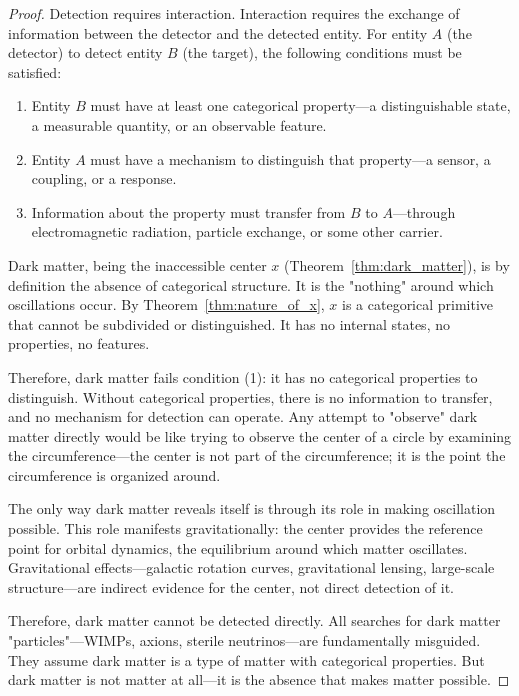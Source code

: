 \documentclass[12pt,a4paper]{article}
\theoremstyle{definition}
\theoremstyle{remark}
\begin{document}
\begin{proof}
Detection requires interaction. Interaction requires the exchange of information between the detector and the detected entity. For entity $A$ (the detector) to detect entity $B$ (the target), the following conditions must be satisfied:
\begin{enumerate}
    \item Entity $B$ must have at least one categorical property—a distinguishable state, a measurable quantity, or an observable feature.
    \item Entity $A$ must have a mechanism to distinguish that property—a sensor, a coupling, or a response.
    \item Information about the property must transfer from $B$ to $A$—through electromagnetic radiation, particle exchange, or some other carrier.
\end{enumerate}

Dark matter, being the inaccessible center $x$ (Theorem~\ref{thm:dark_matter}), is by definition the absence of categorical structure. It is the "nothing" around which oscillations occur. By Theorem~\ref{thm:nature_of_x}, $x$ is a categorical primitive that cannot be subdivided or distinguished. It has no internal states, no properties, no features.

Therefore, dark matter fails condition (1): it has no categorical properties to distinguish. Without categorical properties, there is no information to transfer, and no mechanism for detection can operate. Any attempt to "observe" dark matter directly would be like trying to observe the center of a circle by examining the circumference—the center is not part of the circumference; it is the point the circumference is organized around.

The only way dark matter reveals itself is through its role in making oscillation possible. This role manifests gravitationally: the center provides the reference point for orbital dynamics, the equilibrium around which matter oscillates. Gravitational effects—galactic rotation curves, gravitational lensing, large-scale structure—are indirect evidence for the center, not direct detection of it.

Therefore, dark matter cannot be detected directly. All searches for dark matter "particles"—WIMPs, axions, sterile neutrinos—are fundamentally misguided. They assume dark matter is a type of matter with categorical properties. But dark matter is not matter at all—it is the absence that makes matter possible.
\end{proof}
\end{document}

